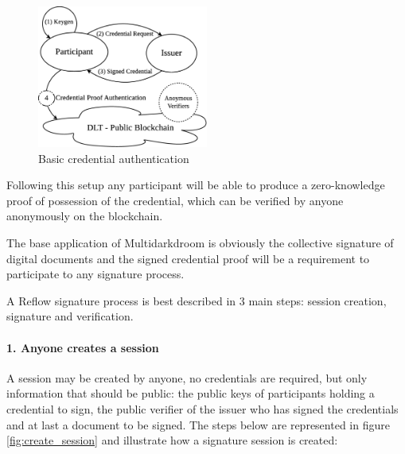 \documentclass[twocolumn]{article}
\begin{document}


\begin{figure}
  \caption{Basic credential authentication }
  \label{fig:credential_diagram}
  \centering
  \includegraphics[width=0.5\textwidth]{credential_diagram.eps}
\end{figure}


Following this setup any participant will be able to produce a
zero-knowledge proof of possession of the credential, which can be
verified by anyone anonymously on the blockchain.

The base application of Multidarkdroom is obviously the collective
signature of digital documents and the signed credential proof will be a
requirement to participate to any signature process.

A Reflow signature process is best described in 3 main steps:
session creation, signature and verification.

\paragraph*{1. Anyone creates a session}

A session may be created by anyone, no credentials are required, but only information that should be public: the public keys of participants holding a credential to sign, the public verifier of the issuer who has signed the credentials and at last a document to be signed. The steps below are represented in figure \ref{fig:create_session} and illustrate how a signature session is created: 
\end{document}
